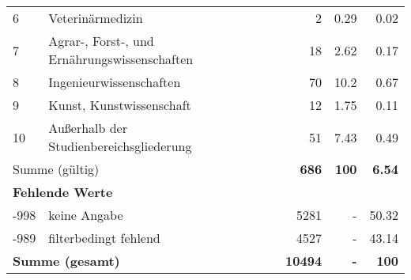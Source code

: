 \begin{longtable}{lXrrr}
     6 &
     \multicolumn{1}{X}{ Veterinärmedizin   } &


       \num{2} &
       \num[round-mode=places,round-precision=2]{0.29} &
         \num[round-mode=places,round-precision=2]{0.02} \\

     7 &
     \multicolumn{1}{X}{ Agrar-, Forst-, und Ernährungswissenschaften   } &


       \num{18} &
       \num[round-mode=places,round-precision=2]{2.62} &
         \num[round-mode=places,round-precision=2]{0.17} \\

     8 &
     \multicolumn{1}{X}{ Ingenieurwissenschaften   } &


       \num{70} &
       \num[round-mode=places,round-precision=2]{10.2} &
         \num[round-mode=places,round-precision=2]{0.67} \\

     9 &
     \multicolumn{1}{X}{ Kunst, Kunstwissenschaft   } &


       \num{12} &
       \num[round-mode=places,round-precision=2]{1.75} &
         \num[round-mode=places,round-precision=2]{0.11} \\

     10 &
     \multicolumn{1}{X}{ Außerhalb der Studienbereichsgliederung   } &


       \num{51} &
       \num[round-mode=places,round-precision=2]{7.43} &
         \num[round-mode=places,round-precision=2]{0.49} \\
     \midrule
     \multicolumn{2}{l}{Summe (gültig)} &
       \textbf{\num{686}} &
     \textbf{\num{100}} &
       \textbf{\num[round-mode=places,round-precision=2]{6.54}} \\
     \multicolumn{5}{l}{\textbf{Fehlende Werte}}\\
       -998 &
       keine Angabe &
         \num{5281} &
        - &
         \num[round-mode=places,round-precision=2]{50.32} \\
       -989 &
       filterbedingt fehlend &
         \num{4527} &
        - &
         \num[round-mode=places,round-precision=2]{43.14} \\
     \midrule
     \multicolumn{2}{l}{\textbf{Summe (gesamt)}} &
          \textbf{\num{10494}} &
        \textbf{-} &
        \textbf{\num{100}} \\
     \bottomrule
     \end{longtable}
     
